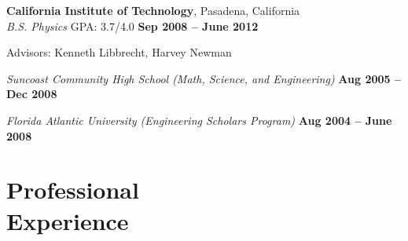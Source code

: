 \documentclass[margin,line]{resume}
\let\origsection\section%
\let\section\subsection%
\let\section\origsection%
\begin{document}
\begin{resume}
    \textbf{California Institute of Technology}, Pasadena, California \vspace{2mm}\\\vspace{1mm}%
    \textsl{B.S. Physics} GPA: 3.7/4.0 \hfill \textbf{ Sep 2008 -- June 2012}\vspace{-3mm}\\\vspace{-1mm}%
    \begin{list2}
        \item Advisors: Kenneth Libbrecht, Harvey Newman
    \end{list2}\vspace{-2mm}

	\textsl{Suncoast Community High School (Math, Science, and Engineering)} \hfill \textbf{Aug 2005 -- Dec 2008}\vspace{-3mm}\\\vspace{-5mm}%

	\textsl{Florida Atlantic University (Engineering Scholars Program)} \hfill \textbf{Aug 2004 -- June 2008}\vspace{-3mm}\\\vspace{-1mm}%

    \section{\mysidestyle Professional\\Experience}


\end{resume}
\end{document}
